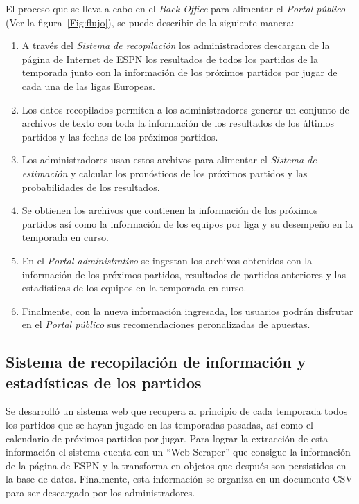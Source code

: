 El proceso que se lleva a cabo en el \emph{Back Office} para alimentar el \emph{Portal público} (Ver la figura~\ref{Fig:flujo}), se puede describir de la siguiente manera:
\begin{enumerate}
	\item A través del \emph{Sistema de recopilación} los administradores descargan de la página de Internet de ESPN los resultados de todos los partidos de la temporada junto con la información de los próximos partidos por jugar  de cada una de las ligas Europeas.
	\item Los datos recopilados permiten a los administradores generar un conjunto de archivos de texto con toda la información de los resultados de los últimos partidos y las fechas de los próximos partidos.
	\item Los administradores usan estos archivos para alimentar el \emph{Sistema de estimación} y calcular los pronósticos de los próximos partidos y las probabilidades de los resultados.
	\item Se obtienen los archivos que contienen la información de los próximos partidos así como la información de los equipos por liga y su desempeño en la temporada en curso.
	\item En el \emph{Portal administrativo} se ingestan los archivos obtenidos con la información de los próximos partidos, resultados de partidos anteriores y las estadísticas de los equipos en la temporada en curso.
	\item Finalmente, con la nueva información ingresada, los usuarios podrán disfrutar en el \emph{Portal público} sus recomendaciones peronalizadas de apuestas.
\end{enumerate}


\subsection{Sistema de recopilación de información y estadísticas de los partidos}
\graphicspath{{/Users/brunomedina/Dropbox/Tesis-Egobets/egobets-notas/resources/recopilador/}}
Se desarrolló un sistema web que recupera al principio de cada temporada todos los partidos que se hayan jugado en las temporadas pasadas, así como el calendario de próximos partidos por jugar. Para lograr la extracción de esta información el sistema cuenta con un ``Web Scraper'' que consigue la información de la página de ESPN y la transforma en objetos que después son persistidos en la base de datos. Finalmente, esta información se organiza en un documento CSV para ser descargado por los administradores.

